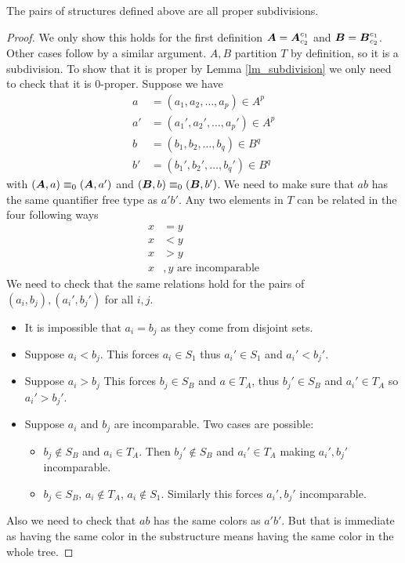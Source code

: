 \documentclass{amsart}
\DeclareMathOperator{\A}{\boldface A}
\DeclareMathOperator{\B}{\boldface B}
\begin{document}
\begin{Lemma} \label{subdivide}
	The pairs of structures defined above are all proper subdivisions.
\end{Lemma}

\begin{proof}
	We only show this holds for the first definition $\A = \A^{c_1}_{c_2}$ and $\B = \B^{c_1}_{c_2}$. Other cases follow by a similar argument. $A,B$ partition $T$ by definition, so it is a subdivision. To show that it is proper by Lemma \ref{lm_subdivision} we only need to check that it is $0$-proper. Suppose we have 
	\begin{align*}
		a &= (a_1, a_2, \ldots, a_p) \in A^p \\
		a' &= (a_1', a_2', \ldots, a_p') \in A^p  \\
		b &= (b_1, b_2, \ldots, b_q) \in B^q  \\
		b' &= (b_1', b_2', \ldots, b_q') \in B^q 
	\end{align*}
	with $(\A, a) \equiv_0 (\A, a')$ and $(\B, b) \equiv_0 (\B, b')$. We need to make sure that $ab$ has the same quantifier free type as $a'b'$. Any two elements in $T$ can be related in the four following ways
	\begin{align*}
		x &= y \\
		x &< y \\
		x &> y \\
		x&,y \text{ are incomparable}
	\end{align*}
	We need to check that the same relations hold for the pairs of $(a_i, b_j), (a_i', b_j')$ for all $i,j$.
	
	\begin{itemize}
		\item It is impossible that $a_i = b_j$ as they come from disjoint sets.
		\item Suppose $a_i < b_j$. This forces $a_i \in S_1$ thus $a_i' \in S_1$ and $a_i' < b_j'$.
		\item Suppose $a_i > b_j$ This forces $b_j \in S_B$ and $a \in T_A$, thus $b_j' \in S_B$ and $a_i' \in T_A$ so $a_i' > b_j'$.
		\item Suppose $a_i$ and $b_j$ are incomparable. Two cases are possible:
		\begin{itemize}
			\item $b_j \notin S_B$ and $a_i \in T_A$. Then $b_j' \notin S_B$ and $a_i' \in T_A$ making $a_i', b_j'$ incomparable.
			\item $b_j \in S_B$, $a_i \notin T_A$, $a_i \notin S_1$. Similarly this forces $a_i', b_j'$ incomparable.
		\end{itemize}
	\end{itemize}
	Also we need to check that $ab$ has the same colors as $a'b'$. But that is immediate as having the same color in the substructure means having the same color in the whole tree.
\end{proof}
\end{document}
